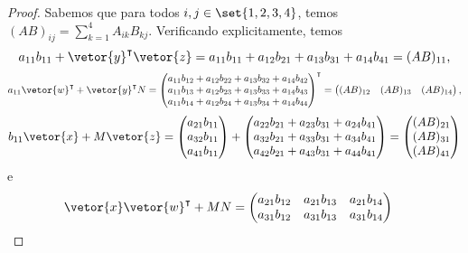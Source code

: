 \begin{proof}
    Sabemos que para todos \(i,j \in \set{1,2,3,4}\), temos \((AB)_{ij} = \sum_{k = 1}^4 A_{ik}B_{kj}\). Verificando explicitamente, temos
    \begin{equation*}
        a_{11}b_{11} + \vetor{y}^\intercal \vetor{z} = a_{11} b_{11} + a_{12}b_{21} + a_{13}b_{31} + a_{14}b_{41} = (AB)_{11},
    \end{equation*}
    \begin{equation*}
        a_{11} \vetor{w}^\intercal + \vetor{y}^\intercal N = \begin{pmatrix}
            a_{11} b_{12} + a_{12} b_{22} + a_{13} b_{32} + a_{14} b_{42} \\
            a_{11} b_{13} + a_{12} b_{23} + a_{13} b_{33} + a_{14} b_{43} \\
            a_{11}b_{14} + a_{12} b_{24} + a_{13} b_{34} + a_{14} b_{44}
        \end{pmatrix}^\intercal = \begin{pmatrix}
        (AB)_{12} & (AB)_{13} & (AB)_{14}
        \end{pmatrix},
    \end{equation*}
    \begin{equation*}
        b_{11}\vetor{x} + M\vetor{z} = \begin{pmatrix}
            a_{21}b_{11}\\
            a_{32}b_{11}\\
            a_{41}b_{11}
        \end{pmatrix} +
        \begin{pmatrix}
            a_{22}b_{21} + a_{23}b_{31} + a_{24}b_{41}\\
            a_{32}b_{21} + a_{33}b_{31} + a_{34}b_{41}\\
            a_{42}b_{21} + a_{43}b_{31} + a_{44}b_{41}
        \end{pmatrix} =
        \begin{pmatrix}
            (AB)_{21}\\
            (AB)_{31}\\
            (AB)_{41}
        \end{pmatrix}
    \end{equation*}
    e
    \begin{align*}
        \vetor{x}\vetor{w}^\intercal + MN &= \begin{pmatrix}
            a_{21}b_{12} & a_{21} b_{13} & a_{21} b_{14}\\
            a_{31}b_{12} & a_{31} b_{13} & a_{31} b_{14}\\

\end{pmatrix}
\end{align*}
\end{proof}
